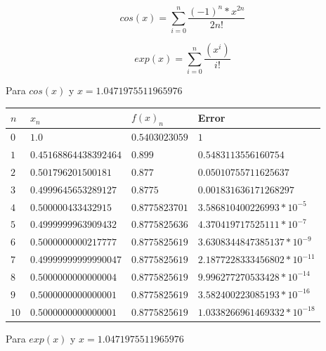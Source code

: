 \documentclass[12pt]{article}
\begin{document}
        \begin{equation}
            cos(x) = \sum_{i=0}^{n} \frac{(-1)^{n} * x^{2n}}{2n!}
        \end{equation}

        \begin{equation}
            exp(x) = \sum_{i=0}^{n} \frac{(x^{i})} {i!}
        \end{equation}

    Para $cos(x)$ y $x = 1.0471975511965976$
        \begin{center}
            \begin{tabular}{|l|l|l|l|} \hline
            $n$ & $x_{n}$ & $f(x)_{n}$ & Error \\
            \hline \hline
            $0$ & $1.0$ &  $0.5403023059$ & $1$    \\
            \hline 
            $1$ & $0.45168864438392464$ & $0.899$ & $0.5483113556160754$\\
            \hline 
            $2$ & $0.501796201500181$ & $0.877$ & $0.05010755711625637$\\
            \hline 
            $3$ & $0.4999645653289127$ & $0.8775$ & $0.001831636171268297$\\
            \hline 
            $4$ & $0.500000433432915$ & $0.8775823701$ & $3.586810400226993 * 10^{-5}$\\
            \hline 
            $5$ & $0.4999999963909432$ & $0.8775825636$ & $4.370419717525111 * 10^{-7}$\\
            \hline 
            $6$ & $0.5000000000217777$ & $0.8775825619$ & $ 3.6308344847385137 * 10^{-9}$\\
            \hline 
            $7$ & $0.49999999999990047$ & $0.8775825619$ & $2.1877228333456802 * 10^{-11}$\\
            \hline 
            $8$ & $0.5000000000000004$ & $0.8775825619$ & $9.996277270533428 * 10^{-14}$\\
            \hline 
            $9$ & $0.5000000000000001$ & $0.8775825619$ & $3.582400223085193 * 10^{-16}$\\
            \hline 
            $10$ & $0.5000000000000001$ & $0.8775825619$ & $1.0338266961469332 * 10^{-18}$\\
            \hline
            \end{tabular}
        \end{center}
    Para $exp(x)$ y $x = 1.0471975511965976$
\end{document}

